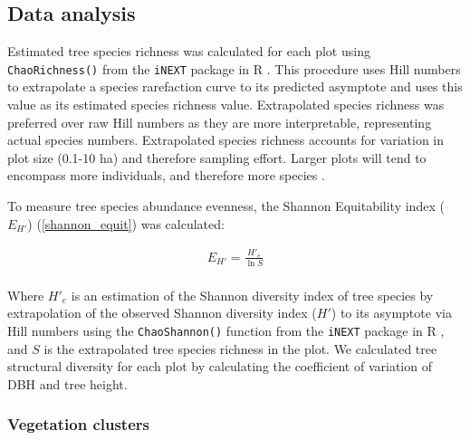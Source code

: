 \documentclass[11pt,a4paper]{article}
\begin{document}
% 
% 

\subsection{Data analysis}
Estimated tree species richness was calculated for each plot using \verb|ChaoRichness()| from the \verb|iNEXT| package in R \citep{Hsieh2016}. This procedure uses Hill numbers to extrapolate a species rarefaction curve to its predicted asymptote and uses this value as its estimated species richness value. Extrapolated species richness was preferred over raw Hill numbers as they are more interpretable, representing actual species numbers. Extrapolated species richness accounts for variation in plot size (0.1-10 ha) and therefore sampling effort. Larger plots will tend to encompass more individuals, and therefore more species \citep{Dengler2009}.

To measure tree species abundance evenness, the Shannon Equitability index ($E_{H'}$) \citep{Smith1996} (\autoref{shannon_equit}) was calculated: 

\begin{equation}
	\begin{gathered}
		E_{H'} = \frac{H'_{e}}{\ln{S}} \\
	\end{gathered}
	\label{shannon_equit}
\end{equation}

Where $H'_{e}$ is an estimation of the Shannon diversity index of tree species by extrapolation of the observed Shannon diversity index ($H'$) to its asymptote via Hill numbers using the \verb|ChaoShannon()| function from the \verb|iNEXT| package in R \citep{Hsieh2016}, and $S$ is the extrapolated tree species richness in the plot. We calculated tree structural diversity for each plot by calculating the coefficient of variation of DBH and tree height. 

\subsubsection{Vegetation clusters}
\end{document}
